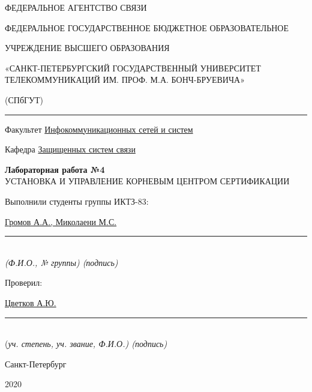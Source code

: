 \documentclass[a4paper,14pt]{extarticle}
\begin{document}
    \begin{center}
        \thispagestyle{empty}
        \begin{singlespace}
        ФЕДЕРАЛЬНОЕ АГЕНТСТВО СВЯЗИ

        ФЕДЕРАЛЬНОЕ ГОСУДАРСТВЕННОЕ БЮДЖЕТНОЕ ОБРАЗОВАТЕЛЬНОЕ

        УЧРЕЖДЕНИЕ ВЫСШЕГО ОБРАЗОВАНИЯ

        «САНКТ-ПЕТЕРБУРГСКИЙ ГОСУДАРСТВЕННЫЙ УНИВЕРСИТЕТ ТЕЛЕКОММУНИКАЦИЙ ИМ. ПРОФ. М.А. БОНЧ-БРУЕВИЧА»

        (СПбГУТ)
        \end{singlespace}
        \vspace{-1ex}
        \rule{\textwidth}{0.4pt}
        \vspace{-5ex}

        Факультет \underline{Инфокоммуникационных сетей и систем}

        Кафедра \underline{Защищенных систем связи}
        \vspace{10ex}

        \textbf{Лабораторная работа №4}\\
        УСТАНОВКА И УПРАВЛЕНИЕ КОРНЕВЫМ ЦЕНТРОМ СЕРТИФИКАЦИИ


    \end{center}
    \vspace{4ex}
    \begin{flushright}
    \parbox{10 cm}{
    \begin{flushleft}
        Выполнили студенты группы ИКТЗ-83:

        \underline{Громов А.А., Миколаени М.С.} \hfill \rule[-0.85ex]{0.1\textwidth}{0.6pt}\\
        \vspace{-1ex}
        \footnotesize \textit{ (Ф.И.О., № группы) \hfill (подпись)} \normalsize

        Проверил:

        \underline{Цветков А.Ю.} \hfill \rule[-0.85ex]{0.1\textwidth}{0.6pt}\\
        \vspace{-1ex}
        (\footnotesize \textit{уч. степень, уч. звание, Ф.И.О.) \hfill (подпись)} \normalsize

    \end{flushleft}
    }
    \end{flushright}
    \begin{center}
        \vfill
        Санкт-Петербург

        2020

    \end{center}
    \newpage
\end{document}
